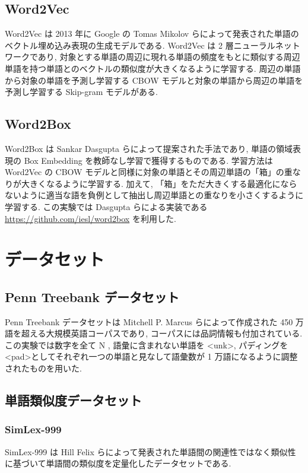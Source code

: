 \documentclass[twocolumn]{jarticle}     %
\begin{document}
\subsection{Word2Vec}
Word2Vec\cite{word2vec} は 2013 年に Google の Tomas Mikolov らによって発表された単語のベクトル埋め込み表現の生成モデルである. 
Word2Vec は 2 層ニューラルネットワークであり, 対象とする単語の周辺に現れる単語の頻度をもとに類似する周辺単語を持つ単語とのベクトルの類似度が大きくなるように学習する. 
周辺の単語から対象の単語を予測し学習する CBOW モデルと対象の単語から周辺の単語を予測し学習する Skip-gram モデルがある.

\subsection{Word2Box}
Word2Box\cite{dasgupta-etal-2022-word2box} は Sankar Dasgupta らによって提案された手法であり, 単語の領域表現の Box Embedding を教師なし学習で獲得するものである. 
学習方法は Word2Vec の CBOW モデルと同様に対象の単語とその周辺単語の「箱」の重なりが大きくなるように学習する. 
加えて, 「箱」をただ大きくする最適化にならないように適当な語を負例として抽出し周辺単語との重なりを小さくするように学習する. 
この実験では Dasgupta らによる実装である \url{https://github.com/iesl/word2box} を利用した. 

\section{データセット}
\subsection{Penn Treebank データセット}
Penn Treebank データセット\cite{ptb}は 	Mitchell P. Marcus らによって作成された 450 万語を超える大規模英語コーパスであり, コーパスには品詞情報も付加されている. 
この実験では数字を全て N , 語彙に含まれない単語を \textless unk\textgreater , パディングを \textless pad\textgreater としてそれぞれ一つの単語と見なして語彙数が 1 万語になるように調整されたものを用いた.

\subsection{単語類似度データセット}
\subsubsection{SimLex-999}
SimLex-999\cite{simlex999} は Hill Felix らによって発表された単語間の関連性ではなく類似性に基づいて単語間の類似度を定量化したデータセットである. 
\end{document}
